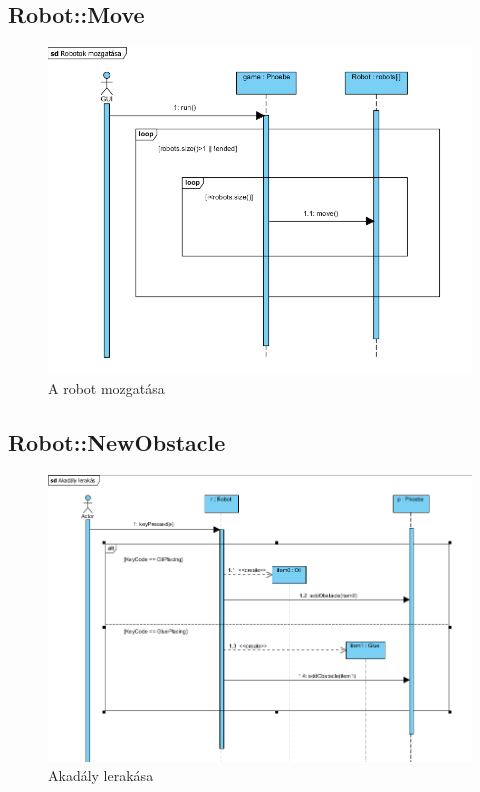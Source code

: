 \subsection{Robot::Move}
\begin{figure}[h]
\begin{center}
\includegraphics[width=17cm]{images/RobotMove.png}
\caption{A robot mozgatása}
\label{fig:example8}
\end{center}
\end{figure}
\pagebreak

\subsection{Robot::NewObstacle}
\begin{figure}[h]
\begin{center}
\includegraphics[width=17cm]{images/RobotAddObstacle.png}
\caption{Akadály lerakása}
\label{fig:example9}
\end{center}
\end{figure}
\pagebreak

